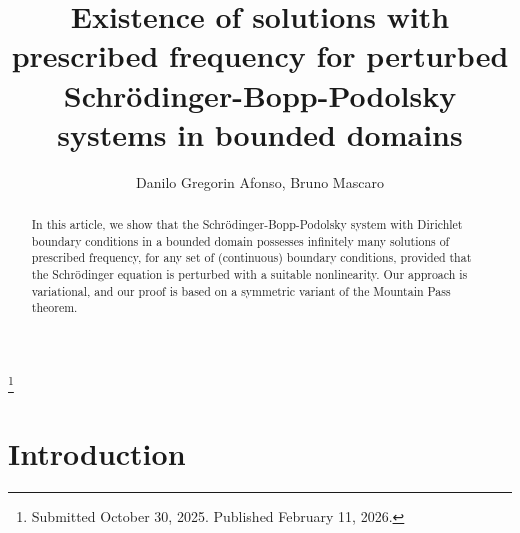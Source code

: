 \documentclass[reqno]{amsart}
\begin{document}
\title[\hfilneg EJDE-2026/11\hfil Perturbed Schr\"odinger-Bopp-Podolsky systems]
{Existence of solutions with prescribed frequency for perturbed 
Schr\"odinger-Bopp-Podolsky systems in bounded domains}

\author[D. G. Afonso, B. Mascaro \hfil EJDE-2026/11\hfilneg]
{Danilo Gregorin Afonso, Bruno Mascaro}

\address{Danilo Gregorin Afonso\newline
Universit\`a San Raffaele Roma,
Via di Val Cannuta 247, 00166, Roma, Italy}

\address{Bruno Mascaro \newline
Faculdade de Computa\c{c}\~ao e Inform\'atica,
Universidade Presbiteriana Mackenzie,
R. da Consola\c{c}\~ao 930, S\~ao Paulo, Brasil.\newline
Instituto Mau\'a de Tecnologia, 
Pra\c{c}a Mau\'a 1, S\~ao Caetano - SP, Brasil}

\thanks{Submitted October 30, 2025. Published February 11, 2026.}

\begin{abstract}
In this article, we show that the Schr\"odinger-Bopp-Podolsky system with Dirichlet
boundary conditions in a bounded domain possesses infinitely many solutions of
prescribed frequency, for any set of (continuous) boundary conditions, provided that
the Schr\"odinger equation is perturbed with a suitable nonlinearity. Our approach
is variational, and our proof is based on a symmetric variant of the Mountain Pass
theorem.
\end{abstract}

\maketitle
{}
\newtheorem{theorem}{Theorem}[section]
\newtheorem{lemma}[theorem]{Lemma}
\newtheorem{proposition}[theorem]{Proposition}
\newtheorem{remark}[theorem]{Remark}
\allowdisplaybreaks

\section{Introduction} 
\label{sec:intro}
\end{document}
